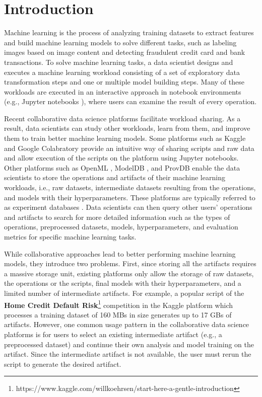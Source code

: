 \section{Introduction} \label{sec-introduction}
Machine learning is the process of analyzing training datasets to extract features and build machine learning models to solve different tasks, such as labeling images based on image content and detecting fraudulent credit card and bank transactions.
To solve machine learning tasks, a data scientist designs and executes a machine learning workload consisting of a set of exploratory data transformation steps and one or multiple model building steps.
Many of these workloads are executed in an interactive approach in notebook environments (e.g., Jupyter notebooks \cite{Kluyver:2016aa}), where users can examine the result of every operation.

Recent collaborative data science platforms facilitate workload sharing.
As a result, data scientists can study other workloads, learn from them, and improve them to train better machine learning models.
Some platforms such as Kaggle \cite{kagglewebsite} and Google Colabratory \cite{googlecolab} provide an intuitive way of sharing scripts and raw data and allow execution of the scripts on the platform using Jupyter notebooks. 
Other platforms such as OpenML \cite{vanschoren2014openml}, ModelDB \cite{vartak2016m}, and ProvDB \cite{miao2018provdb} enable the data scientists to store the operations and artifacts of their machine learning workloads, i.e., raw datasets, intermediate datasets resulting from the operations, and models with their hyperparameters.
These platforms are typically referred to as experiment databases \cite{Vanschoren2012}.
Data scientists can then query other users' operations and artifacts to search for more detailed information such as the types of operations, preprocessed datasets, models, hyperparameters, and evaluation metrics for specific machine learning tasks.

While collaborative approaches lead to better performing machine learning models, they introduce two problems.
First, since storing all the artifacts requires a massive storage unit, existing platforms only allow the storage of raw datasets, the operations or the scripts, final models with their hyperparameters, and a limited number of intermediate artifacts.
For example, a popular script of the \textbf{Home Credit Default Risk}\footnote{https://www.kaggle.com/willkoehrsen/start-here-a-gentle-introduction} competition in the Kaggle platform which processes a training dataset of 160 MBs in size generates up to 17 GBs of artifacts.
However, one common usage pattern in the collaborative data science platforms is for users to select an existing intermediate artifact (e.g., a preprocessed dataset) and continue their own analysis and model training on the artifact. 
Since the intermediate artifact is not available, the user must rerun the script to generate the desired artifact.

